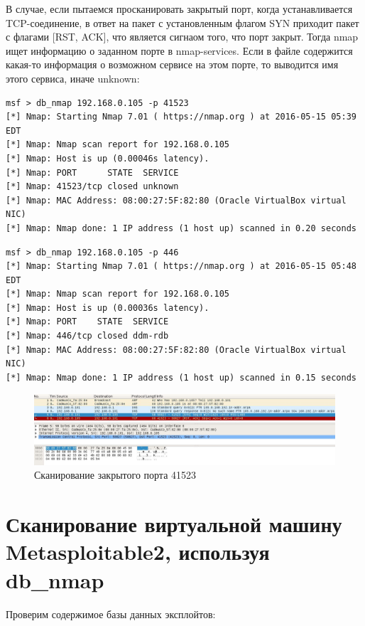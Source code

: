 \documentclass[12pt,a4paper]{report}
\begin{document}
В случае, если пытаемся просканировать закрытый порт, когда устанавливается TCP-соединение, в ответ на пакет с установленным флагом SYN приходит пакет с флагами [RST, ACK], что является сигнаом того, что порт закрыт. Тогда nmap ищет информацию о заданном порте в nmap-services. Если в файле содержится какая-то информация о возможном сервисе на этом порте, то выводится имя этого сервиса, иначе unknown:
\begin{lstlisting}[breaklines]
msf > db_nmap 192.168.0.105 -p 41523
[*] Nmap: Starting Nmap 7.01 ( https://nmap.org ) at 2016-05-15 05:39 EDT
[*] Nmap: Nmap scan report for 192.168.0.105
[*] Nmap: Host is up (0.00046s latency).
[*] Nmap: PORT      STATE  SERVICE
[*] Nmap: 41523/tcp closed unknown
[*] Nmap: MAC Address: 08:00:27:5F:82:80 (Oracle VirtualBox virtual NIC)
[*] Nmap: Nmap done: 1 IP address (1 host up) scanned in 0.20 seconds
\end{lstlisting}
\begin{lstlisting}[breaklines]
msf > db_nmap 192.168.0.105 -p 446
[*] Nmap: Starting Nmap 7.01 ( https://nmap.org ) at 2016-05-15 05:48 EDT
[*] Nmap: Nmap scan report for 192.168.0.105
[*] Nmap: Host is up (0.00036s latency).
[*] Nmap: PORT    STATE  SERVICE
[*] Nmap: 446/tcp closed ddm-rdb
[*] Nmap: MAC Address: 08:00:27:5F:82:80 (Oracle VirtualBox virtual NIC)
[*] Nmap: Nmap done: 1 IP address (1 host up) scanned in 0.15 seconds
\end{lstlisting}

\begin{figure}[ht!]
\centering
\includegraphics[width=160mm]{res/wireshark2.jpg}
\caption{Сканирование закрытого порта 41523\label{overflow}}
\end{figure}


\section*{Сканирование виртуальной машину Metasploitable2, используя db\_nmap}

Проверим содержимое базы данных эксплойтов:
\end{document}
